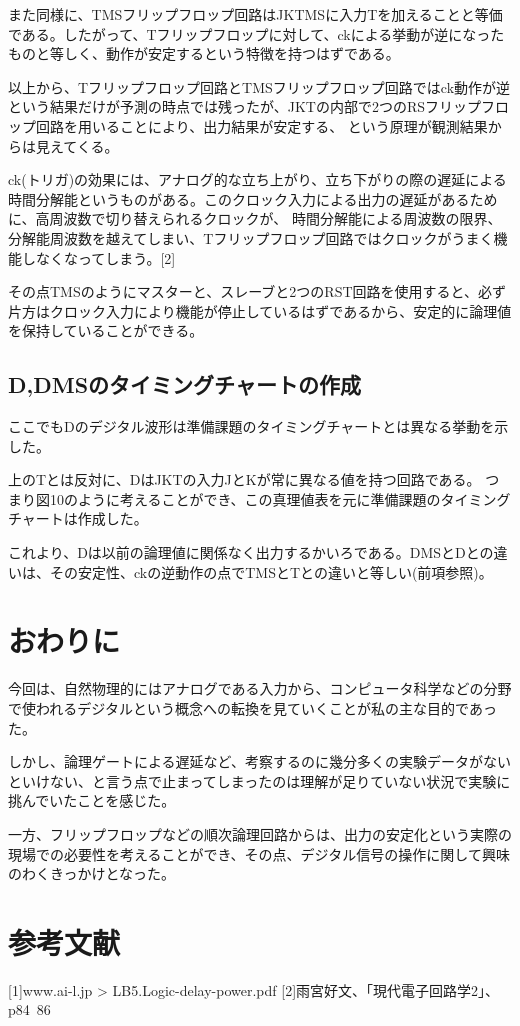 \documentclass[11pt,a4j]{jsarticle}
\begin{document}
  また同様に、TMSフリップフロップ回路はJKTMSに入力Tを加えることと等価である。したがって、Tフリップフロップに対して、ckによる挙動が逆になったものと等しく、動作が安定するという特徴を持つはずである。
  
  以上から、Tフリップフロップ回路とTMSフリップフロップ回路ではck動作が逆という結果だけが予測の時点では残ったが、JKTの内部で2つのRSフリップフロップ回路を用いることにより、出力結果が安定する、
  という原理が観測結果からは見えてくる。
  
  ck(トリガ)の効果には、アナログ的な立ち上がり、立ち下がりの際の遅延による時間分解能というものがある。このクロック入力による出力の遅延があるために、高周波数で切り替えられるクロックが、
  時間分解能による周波数の限界、分解能周波数を越えてしまい、Tフリップフロップ回路ではクロックがうまく機能しなくなってしまう。[2]
  
  その点TMSのようにマスターと、スレーブと2つのRST回路を使用すると、必ず片方はクロック入力により機能が停止しているはずであるから、安定的に論理値を保持していることができる。
  
  \subsection{D,DMSのタイミングチャートの作成}
  ここでもDのデジタル波形は準備課題のタイミングチャートとは異なる挙動を示した。
  
  上のTとは反対に、DはJKTの入力JとKが常に異なる値を持つ回路である。
  つまり図10のように考えることができ、この真理値表を元に準備課題のタイミングチャートは作成した。
  
  これより、Dは以前の論理値に関係なく出力するかいろである。DMSとDとの違いは、その安定性、ckの逆動作の点でTMSとTとの違いと等しい(前項参照)。
  
  \newpage
  
  
 \section{おわりに}
  今回は、自然物理的にはアナログである入力から、コンピュータ科学などの分野で使われるデジタルという概念への転換を見ていくことが私の主な目的であった。
  
  しかし、論理ゲートによる遅延など、考察するのに幾分多くの実験データがないといけない、と言う点で止まってしまったのは理解が足りていない状況で実験に挑んでいたことを感じた。
  
  
  一方、フリップフロップなどの順次論理回路からは、出力の安定化という実際の現場での必要性を考えることができ、その点、デジタル信号の操作に関して興味のわくきっかけとなった。
  
  
 \section{参考文献}
  [1]www.ai-l.jp > LB5.Logic-delay-power.pdf
  [2]雨宮好文、「現代電子回路学2」、p84~86
  
\end{document}
